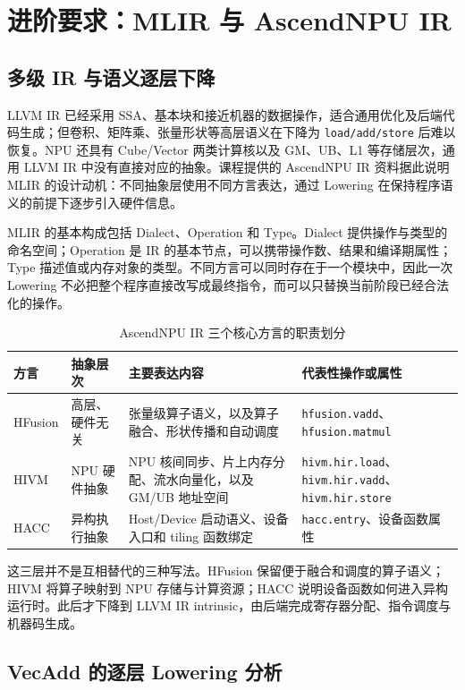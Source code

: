 \documentclass[UTF8,a4paper,10pt]{ctexart}
\begin{document}
\section{进阶要求：MLIR 与 AscendNPU IR}

\subsection{多级 IR 与语义逐层下降}

LLVM IR 已经采用 SSA、基本块和接近机器的数据操作，适合通用优化及后端代码生成；但卷积、矩阵乘、张量形状等高层语义在下降为 \texttt{load/add/store} 后难以恢复。NPU 还具有 Cube/Vector 两类计算核以及 GM、UB、L1 等存储层次，通用 LLVM IR 中没有直接对应的抽象。课程提供的 AscendNPU IR 资料据此说明 MLIR 的设计动机：不同抽象层使用不同方言表达，通过 Lowering 在保持程序语义的前提下逐步引入硬件信息。

MLIR 的基本构成包括 Dialect、Operation 和 Type。Dialect 提供操作与类型的命名空间；Operation 是 IR 的基本节点，可以携带操作数、结果和编译期属性；Type 描述值或内存对象的类型。不同方言可以同时存在于一个模块中，因此一次 Lowering 不必把整个程序直接改写成最终指令，而可以只替换当前阶段已经合法化的操作。

\begin{table}[H]
  \centering
  \caption{AscendNPU IR 三个核心方言的职责划分}
  \begin{tabularx}{\textwidth}{p{2.1cm}p{2.2cm}Yp{3.2cm}}
    \toprule
    方言 & 抽象层次 & 主要表达内容 & 代表性操作或属性 \\
    \midrule
    HFusion & 高层、硬件无关 & 张量级算子语义，以及算子融合、形状传播和自动调度 & \texttt{hfusion.vadd}、\texttt{hfusion.matmul} \\
    HIVM & NPU 硬件抽象 & NPU 核间同步、片上内存分配、流水向量化，以及 GM/UB 地址空间 & \texttt{hivm.hir.load}、\texttt{hivm.hir.vadd}、\texttt{hivm.hir.store} \\
    HACC & 异构执行抽象 & Host/Device 启动语义、设备入口和 tiling 函数绑定 & \texttt{hacc.entry}、设备函数属性 \\
    \bottomrule
  \end{tabularx}
\end{table}

这三层并不是互相替代的三种写法。HFusion 保留便于融合和调度的算子语义；HIVM 将算子映射到 NPU 存储与计算资源；HACC 说明设备函数如何进入异构运行时。此后才下降到 LLVM IR intrinsic，由后端完成寄存器分配、指令调度与机器码生成\cite{ascend-arch}。

\subsection{VecAdd 的逐层 Lowering 分析}
\end{document}
